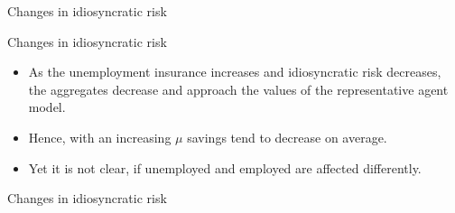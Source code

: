 \documentclass{beamer}
\begin{document}
\begin{frame}{Changes in idiosyncratic risk}

\end{frame}	
	
	
\begin{frame}{Changes in idiosyncratic risk}
	\begin{itemize}
	
	\item {
	As the unemployment insurance increases and idiosyncratic risk decreases, the aggregates decrease and approach the values of the representative agent model. 
	}

	\item {
Hence, with an increasing $\mu$ savings tend to decrease on average.
	}

	\item {
Yet it is not clear, if unemployed and employed are affected differently. 
	}	

	\end{itemize} 
\end{frame}
	
\begin{frame}{Changes in idiosyncratic risk}

\end{frame}
\end{document}
